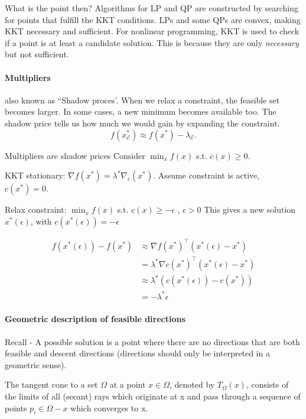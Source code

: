 \documentclass{article}
\begin{document}
\medskip What is the point then? Algorithms for LP and QP are constructed by searching for points that fulfill
the KKT conditions. LPs and some QPs are convex, making KKT necessary and sufficient. For nonlinear programming, KKT is used
to check if a point is at least a candidate solution. This is because they are only \textit{necessary} but not sufficient.

\paragraph{Multipliers} also known as ``Shadow proces'. When we relax a constraint, the feasible set becomes larger.
In some cases, a new minimum becomes available too. The shadow price tells us how much we would gain by expanding the constraint.
\[
  f(x^*_{\mathcal{E}}) \approx f(x^*) - \lambda_{\mathcal{E}}
  .\]

\begin{proofbox}{Multipliers are shadow prices}
  Consider $\min_x f(x)$ s.t. $c(x) \geq 0$.

  \medskip KKT stationary: $\nabla f(x^*) = \lambda ^*\nabla_{c}(x^*)$. Assume constraint is active, $c(x^*) = 0$.

  \medskip Relax constraint: $\min_x f(x)$ s.t. $c(x) \geq -\epsilon$ , $\epsilon > 0$
  This gives a new solution $x^*(\epsilon)$, with $c(x^*(\epsilon)) = - \epsilon$

  \medskip
  \begin{align*}
    f(x^*(\epsilon)) - f(x^*) & \approx \nabla f(x^*)^{\top}(x^*(\epsilon) - x^*)    \\
                              & = \lambda^*\nabla c(x^*)^{\top}(x^*(\epsilon) - x^*) \\
                              & \approx \lambda^*(c(x^*(\epsilon)) - c(x^*))         \\
                              & = -\lambda^*\epsilon
  \end{align*}
\end{proofbox}

\paragraph{Geometric description of feasible directions} Recall - A possible solution is a point where
there are no directions that are both feasible and descent directions (directions should only be interpreted in a geometric sense).

\medskip The tangent cone to a set $\Omega$ at a point $x\in \Omega$, denoted by
$T_{\Omega}(x)$, consists of the limits of all (secant) rays which originate at x and pass through a sequence of points $p_i\in \Omega - {x}$ which converges to x.
\end{document}
